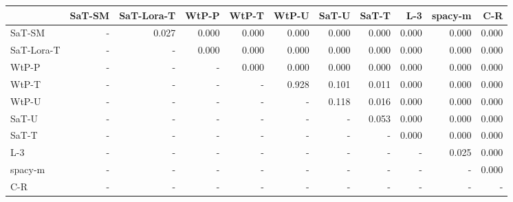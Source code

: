 \begin{tabular}{lrrrrrrrrrr}
\toprule
 & SaT-SM & SaT-Lora-T & WtP-P & WtP-T & WtP-U & SaT-U & SaT-T & L-3 & spacy-m & C-R \\
\midrule
SaT-SM & - & 0.027 & 0.000 & 0.000 & 0.000 & 0.000 & 0.000 & 0.000 & 0.000 & 0.000 \\
SaT-Lora-T & - & - & 0.000 & 0.000 & 0.000 & 0.000 & 0.000 & 0.000 & 0.000 & 0.000 \\
WtP-P & - & - & - & 0.000 & 0.000 & 0.000 & 0.000 & 0.000 & 0.000 & 0.000 \\
WtP-T & - & - & - & - & 0.928 & 0.101 & 0.011 & 0.000 & 0.000 & 0.000 \\
WtP-U & - & - & - & - & - & 0.118 & 0.016 & 0.000 & 0.000 & 0.000 \\
SaT-U & - & - & - & - & - & - & 0.053 & 0.000 & 0.000 & 0.000 \\
SaT-T & - & - & - & - & - & - & - & 0.000 & 0.000 & 0.000 \\
L-3 & - & - & - & - & - & - & - & - & 0.025 & 0.000 \\
spacy-m & - & - & - & - & - & - & - & - & - & 0.000 \\
C-R & - & - & - & - & - & - & - & - & - & - \\
\bottomrule
\end{tabular}

